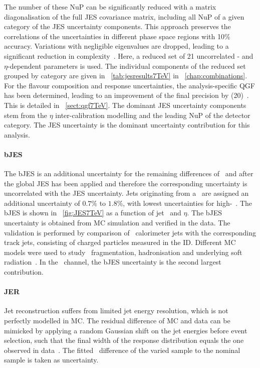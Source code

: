 %
The number of these \gls{NuP} can be significantly reduced with a matrix diagonalisation of the full \gls{JES} covariance matrix, including all \gls{NuP} of a given category of the \gls{JES} uncertainty components. 
%
This approach preserves the correlations of the uncertainties in different phase space regions with 10\% accuracy. 
%
Variations with negligible eigenvalues are dropped, leading to a significant reduction in complexity~\cite{ATLASCollaboration2015b}. 
%
Here, a reduced set of 21 uncorrelated \pt- and $\eta$-dependent parameters is used.
%
The individual components of the reduced set grouped by category are given in \tab~\ref{tab:jesresults7TeV} in \chap~\ref{chap:combinations}. 
%
For the flavour composition and response uncertainties, the analysis-specific \gls{QGF} has been determined, leading to an improvement of the final precision by \order(20)~\MeV. This is detailed in \sect~\ref{sect:qgf7TeV}. 
%
The dominant \gls{JES} uncertainty components stem from the $\eta$ inter-calibration modelling and the leading \gls{NuP} of the detector category. The \gls{JES} uncertainty is the dominant uncertainty contribution for this analysis. 

%
%
%
\paragraph{\Gls{bJES}}\mbox{}
%
The \gls{bJES} is an additional uncertainty for the remaining differences of \ and  after the global \gls{JES} has been applied and therefore the corresponding uncertainty is uncorrelated with the \gls{JES} uncertainty. 
%
Jets originating from a \bhadron\ are assigned an additional uncertainty of $0.7\%$ to $1.8\%$, with lowest uncertainties for high-\pt\ . The \gls{bJES} is shown in \fig~\ref{fig:JES7TeV} as a function of jet \pt\ and $\eta$. 
%
The \gls{bJES} uncertainty is obtained from \gls{MC} simulation and verified in the data. 
%
The validation is performed by comparison of \btagged\ calorimeter jets with the corresponding track jets, consisting of charged particles measured in the \gls{ID}.
%
Different \gls{MC} models were used to study \bquark\ fragmentation, hadronisation and underlying soft radiation~\cite{ATLASCollaboration2015b}. 
%
In the \ttbarll\ channel, the \gls{bJES} uncertainty is the second largest contribution. 
%
%
\paragraph{\gls{JER}}\mbox{}
%
Jet reconstruction suffers from limited jet energy resolution, which is not perfectly modelled in \gls{MC}. 
%
The residual difference of \gls{MC} and data can be mimicked by applying a random Gaussian shift on the jet energies before event selection, such that the final width of the response distribution equals the one observed in data~\cite{Aad:1489592}. 
%
The fitted \mt\ difference of the varied sample to the nominal sample is taken as uncertainty.
%
%
